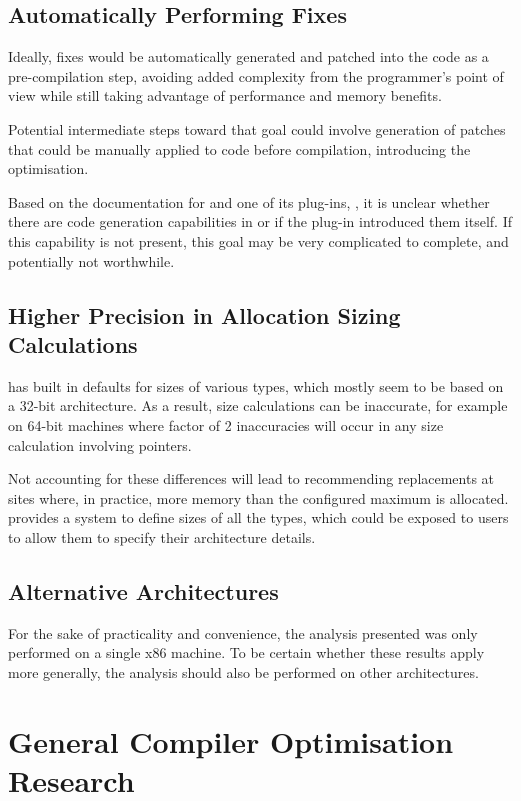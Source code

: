 \subsection{Automatically Performing Fixes}

Ideally, fixes would be automatically generated and patched into the code as a pre-compilation step, avoiding added complexity from the programmer's point of view while still taking advantage of performance and memory benefits.

Potential intermediate steps toward that goal could involve generation of patches that could be manually applied to code before compilation, introducing the optimisation.

Based on the documentation for  and one of its plug-ins, , it is unclear whether there are code generation capabilities in  or if the plug-in introduced them itself. If this capability is not present, this goal may be very complicated to complete, and potentially not worthwhile.

\subsection{Higher Precision in Allocation Sizing Calculations}

 has built in defaults for sizes of various types, which mostly seem to be based on a 32-bit architecture. As a result, size calculations can be inaccurate, for example on 64-bit machines where factor of 2 inaccuracies will occur in any size calculation involving pointers.

Not accounting for these differences will lead to  recommending replacements at sites where, in practice, more memory than the configured maximum is allocated.  provides a system to define sizes of all the types, which could be exposed to users to allow them to specify their architecture details.

\subsection{Alternative Architectures}

For the sake of practicality and convenience, the analysis presented was only performed on a single x86 machine. To be certain whether these results apply more generally, the analysis should also be performed on other architectures.

\section{General Compiler Optimisation Research}

